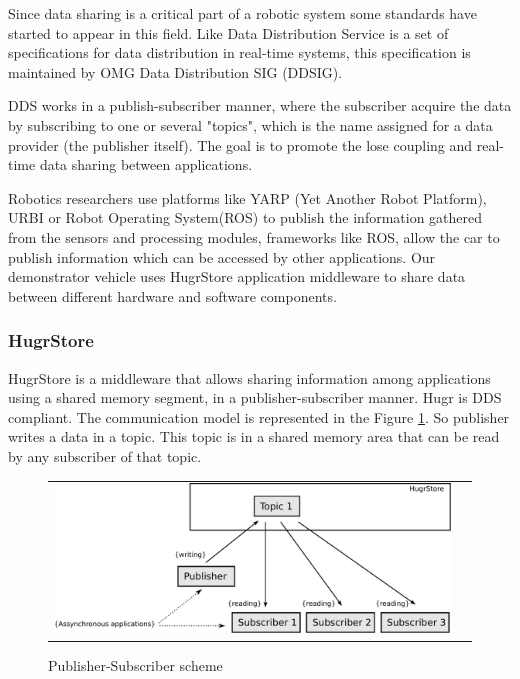 Since data sharing is a critical part of a robotic system some standards have started to appear in this field. Like Data Distribution Service \cite{dds} is a set of specifications for data distribution in real-time systems, this specification is maintained by OMG Data Distribution SIG (DDSIG).

DDS works in a publish-subscriber manner, where the subscriber acquire the data by subscribing to one or several  "topics", which is the name assigned for a data provider (the publisher itself). The goal is to promote the lose coupling and real-time data sharing between applications.

Robotics researchers use platforms like YARP (Yet Another Robot Platform), URBI \cite{urbi} or Robot Operating System(ROS) \cite{ros} to publish the information gathered from the sensors and processing modules, frameworks like ROS, allow the car to publish information which can be accessed by other applications.%
Our demonstrator vehicle uses HugrStore \cite{hugr} application middleware to share data between different hardware and software components.


\subsubsection{HugrStore}
HugrStore is a middleware that allows sharing information among applications using a shared memory segment, in a publisher-subscriber manner. Hugr is DDS compliant. The communication model is represented in the Figure \ref{fig:dds:hugr}. So publisher writes a data in a topic. This topic is in a shared memory area that can be read by any subscriber of that topic.

\begin{figure}[H]
   \centering
     \begin{tabular}{lr}
       \includegraphics[scale=0.50]{img/fig:dds:hugr}
     \end{tabular}
   \caption{Publisher-Subscriber scheme}
   \label{fig:dds:hugr}
\end{figure}

